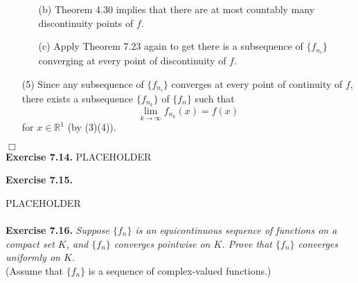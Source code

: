 \documentclass{article}
\begin{document}
\begin{enumerate}
\begin{enumerate}
  \item[(b)]
    Theorem 4.30 implies that there are at most countably many discontinuity points of $f$.

  \item[(c)]
    Apply Theorem 7.23 again to get there is
    a subsequence of $\{f_{n_i}\}$ converging
    at every point of discontinuity of $f$.
  \end{enumerate}

\item[(5)]
  Since any subsequence of $\{f_{n_i}\}$ converges at every point of continuity of $f$,
  there exists a subsequence $\{f_{n_k}\}$ of $\{f_n\}$ such that
  \[
    \lim_{k \to \infty} f_{n_k}(x) = f(x)
  \]
  for $x \in \mathbb{R}^1$ (by (3)(4)).
\end{enumerate}
$\Box$ \\






\textbf{Exercise 7.14.}
PLACEHOLDER






\textbf{Exercise 7.15.}

PLACEHOLDER \\\\






\textbf{Exercise 7.16.}
\emph{Suppose $\{f_n\}$ is an equicontinuous sequence of functions on a compact set $K$,
and $\{f_n\}$ converges pointwise on $K$.
Prove that $\{f_n\}$ converges uniformly on $K$.} \\

(Assume that $\{f_n\}$ is a sequence of complex-valued functions.) \\
\end{document}
